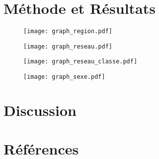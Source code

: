 \documentclass[12pt]{article}
\begin{document}
\section{Méthode et Résultats}

\begin{figure}
\texttt{[image: graph\_region.pdf]}
\end{figure}

\begin{figure}
\texttt{[image: graph\_reseau.pdf]}
\end{figure}

\begin{figure}
\texttt{[image: graph\_reseau\_classe.pdf]}
\end{figure}

\begin{figure}
\texttt{[image: graph\_sexe.pdf]}
\end{figure}



\section{Discussion}


\section{Références}



\end{document}
